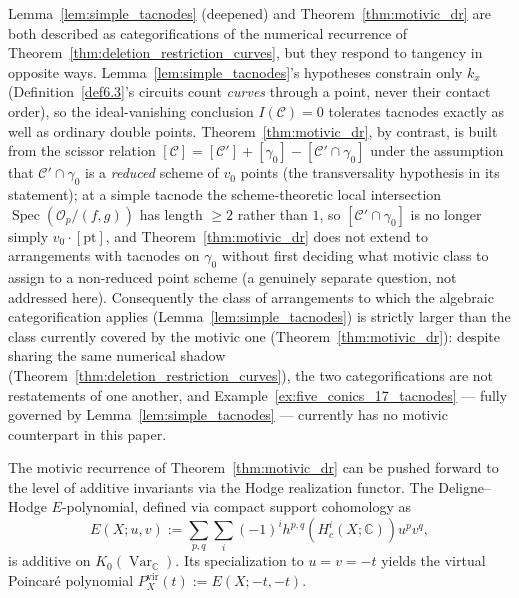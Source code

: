 \documentclass[article,11pt]{amsart} \numberwithin{equation}{section}
\numberwithin{equation}{section}
\begin{document}
{\begin{rk}
	\label{rem:categorification-tangency}
	Lemma~\ref{lem:simple_tacnodes} (deepened) and Theorem~\ref{thm:motivic_dr} are both described as
	categorifications of the numerical recurrence of Theorem~\ref{thm:deletion_restriction_curves}, but they respond to tangency in opposite ways. Lemma~\ref{lem:simple_tacnodes}'s hypotheses constrain only
	$k_x$ (Definition~\ref{def6.3}'s circuits count \emph{curves} through a point, never
	their contact order), so the ideal-vanishing conclusion $I(\mathcal C)=0$
	tolerates tacnodes exactly as well as ordinary double points. Theorem~\ref{thm:motivic_dr},
	by contrast, is built from the scissor relation
	$[\mathcal C]=[\mathcal C']+[\gamma_0]-[\mathcal C'\cap\gamma_0]$ under the
	assumption that $\mathcal C'\cap\gamma_0$ is a \emph{reduced} scheme of
	$v_0$ points (the transversality hypothesis in its statement); at a simple
	tacnode the scheme-theoretic local intersection
	$\operatorname{Spec}(\mathcal O_p/(f,g))$ has length $\ge2$ rather than $1$,
	so $[\mathcal C'\cap\gamma_0]$ is no longer simply $v_0\cdot[\mathrm{pt}]$,
	and Theorem~\ref{thm:motivic_dr} does not extend to arrangements with tacnodes on $\gamma_0$
	without first deciding what motivic class to assign to a non-reduced point
	scheme (a genuinely separate question, not addressed here). Consequently the
	class of arrangements to which the algebraic categorification applies
	(Lemma~\ref{lem:simple_tacnodes}) is strictly larger than the class currently covered by the
	motivic one (Theorem~\ref{thm:motivic_dr}): despite sharing the same numerical shadow
	(Theorem~\ref{thm:deletion_restriction_curves}), the two categorifications are not restatements of one another, and Example~\ref{ex:five_conics_17_tacnodes} --- fully governed by Lemma~\ref{lem:simple_tacnodes} --- currently has
	no motivic counterpart in this paper.
\end{rk}

\begin{rk}
	\label{rmk:hodge_realization}
	The motivic recurrence of Theorem~\ref{thm:motivic_dr} can be pushed
	forward to the level of additive invariants via the Hodge realization
	functor. The Deligne–Hodge $E$-polynomial, defined via compact support
	cohomology as
	\[
	E(X;u,v) := \sum_{p,q} \sum_i (-1)^i h^{p,q}(H^i_c(X; \mathbb{C})) u^p v^q,
	\]
	is additive on $K_0(\operatorname{Var}_{\mathbb{C}})$. Its specialization
	to $u=v=-t$ yields the virtual Poincar\'e polynomial
	$P_X^{\mathrm{vir}}(t) := E(X;-t,-t)$.
	

\end{rk}}
\end{document}
